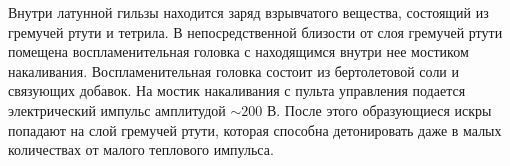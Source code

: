 \documentclass[specialist, subf, href, colorlinks=true, 14pt, final]{disser}
\theoremstyle{definition}
\begin{document}
\begin{figure}[!htp]
  \caption{}
  \label{2-7-2}
\end{figure}
\begin{figure}[!htp]
  \caption{}
  \label{2-7-3}
\end{figure}

\newpage
Внутри латунной гильзы находится заряд взрывчатого вещества, состоящий из гремучей ртути и тетрила. В непосредственной близости от слоя гремучей ртути помещена воспламенительная головка с находящимся внутри нее мостиком накаливания. Воспламенительная головка состоит из бертолетовой соли и связующих добавок. На мостик накаливания с пульта управления подается электрический импульс амплитудой $\sim 200$ В. После этого образующиеся искры попадают на слой гремучей ртути, которая способна детонировать даже в малых количествах от малого теплового импульса.
\end{document}
